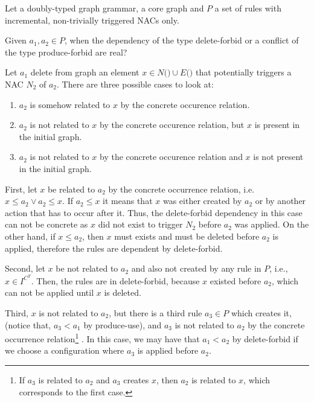 \begin{definition} Let \doublyTypedGraphGrammarCore{} a doubly-typed graph grammar, \coreGraph{} a core graph and $P$ a set of rules with incremental, non-trivially triggered NACs only.

Given $a_1, a_2 \in P$, when the dependency of the type delete-forbid or a conflict of the type produce-forbid are real?

Let $a_1$ delete from graph \coreGraph{} an element $x \in N($\coreGraph$) \cup E($\coreGraph$)$ that potentially triggers a NAC $N_2$ of $a_2$. There are three possible cases to look at:

\begin{enumerate}
  \item $a_2$ is somehow related to $x$ by the concrete occurence relation.
  \item $a_2$ is not related to $x$ by the concrete occurence relation, but $x$ is present in the initial graph.
  \item $a_2$ is not related to $x$ by the concrete occurence relation and $x$ is not present in the initial graph.
\end{enumerate}

First, let $x$ be related to $a_2$ by the concrete occurrence relation, i.e. \mbox{$x \leq a_2 \lor a_2 \leq x$}. If $a_2 \leq x$ it means that $x$ was either created by $a_2$ or by another action that has to occur after it. Thus, the delete-forbid dependency in this case can not be concrete as $x$ did not exist to trigger $N_2$ before $a_2$ was applied. On the other hand, if $x \leq a_2$, then $x$ must exists and must be deleted before $a_2$ is applied, therefore the rules are dependent by delete-forbid.

  Second, let $x$ be not related to $a_2$ and also not created by any rule in $P$, i.e., $x \in I^{C^T}$. Then, the rules are in delete-forbid, because $x$ existed before $a_2$, which can not be applied until $x$ is deleted.

  Third, $x$ is not related to $a_2$, but there is a third rule $a_3 \in P$ which creates it, (notice that, $a_3 < a_1$ by produce-use), and $a_3$ is not related to $a_2$ by the concrete occurrence relation\footnote{If $a_3$ is related to $a_2$ and $a_3$ creates $x$, then $a_2$ is related to $x$, which corresponds to the first case.}
. In this case, we may have that $a_1 < a_2$ by delete-forbid if we choose a configuration where $a_3$ is applied before $a_2$.


\end{definition}

